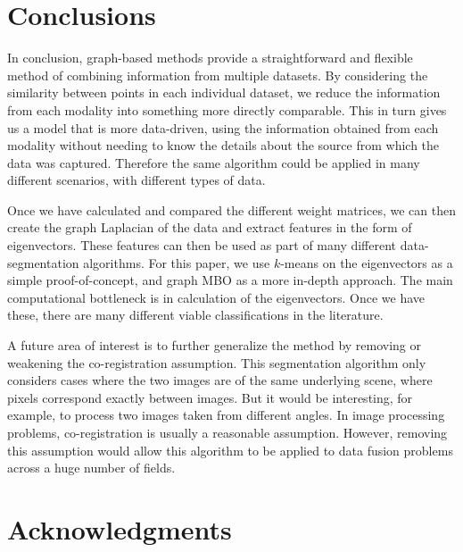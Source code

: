 \documentclass[journal]{IEEEtran}
\begin{document}
\section{Conclusions}
\label{sec:conclusions}

In conclusion, graph-based methods provide a straightforward and flexible method
of combining information from multiple datasets. By considering the similarity
between points in each individual dataset, we reduce the information from each
modality into something more directly comparable. This in turn gives us a model
that is more data-driven, using the information obtained from each modality
without needing to know the details about the source from which the data was
captured. Therefore the same algorithm could be applied in many different
scenarios, with different types of data.

Once we have calculated and compared the different weight matrices, we can then
create the graph Laplacian of the data and extract features in the form of
eigenvectors. These features can then be used as part of many different
data-segmentation algorithms. For this paper, we use $k$-means on the
eigenvectors as a simple proof-of-concept, and graph MBO as a more in-depth
approach. The main computational bottleneck is in calculation of the
eigenvectors. Once we have these, there are many different viable
classifications in the literature.

A future area of interest is to further generalize the method by removing or
weakening the co-registration assumption. This segmentation algorithm only
considers cases where the two images are of the same underlying scene, where
pixels correspond exactly between images. But it would be interesting, for
example, to process two images taken from different angles. In image processing
problems, co-registration is usually a reasonable assumption. However, removing
this assumption would allow this algorithm to be applied to data fusion problems
across a huge number of fields.


\section{Acknowledgments}\label{sec:Acknowledgements}
\end{document}
